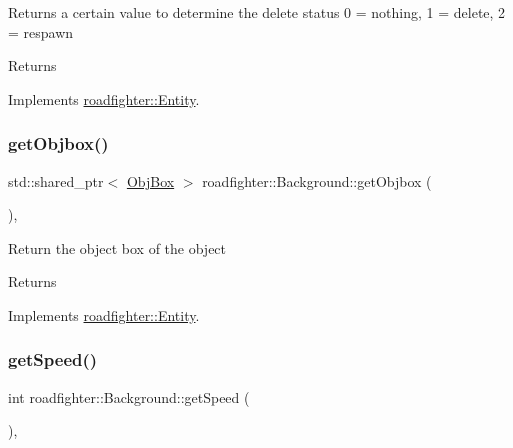 Returns a certain value to determine the delete status 0 = nothing, 1 = delete, 2 = respawn \begin{DoxyReturn}{Returns}

\end{DoxyReturn}


Implements \hyperlink{classroadfighter_1_1Entity_a08190b0b8e6a3fcdb42273d6096152ac}{roadfighter\+::\+Entity}.

\mbox{\label{classroadfighter_1_1Background_af25322839a52bc232266cceb2a85dd7d}} 
\subsubsection{\texorpdfstring{get\+Objbox()}{getObjbox()}}
{\footnotesize\ttfamily std\+::shared\+\_\+ptr$<$ \hyperlink{structObjBox}{Obj\+Box} $>$ roadfighter\+::\+Background\+::get\+Objbox (\begin{DoxyParamCaption}{ }\end{DoxyParamCaption})\hspace{0.3cm}{\ttfamily [override]}, {\ttfamily [virtual]}}

Return the object box of the object \begin{DoxyReturn}{Returns}

\end{DoxyReturn}


Implements \hyperlink{classroadfighter_1_1Entity_af14340d04a725175a6d221f23c35fa0c}{roadfighter\+::\+Entity}.

\mbox{\label{classroadfighter_1_1Background_acbeaa8438617d67f8069347000e185a1}} 
\subsubsection{\texorpdfstring{get\+Speed()}{getSpeed()}}
{\footnotesize\ttfamily int roadfighter\+::\+Background\+::get\+Speed (\begin{DoxyParamCaption}{ }\end{DoxyParamCaption})\hspace{0.3cm}{\ttfamily [override]}, {\ttfamily [virtual]}}

